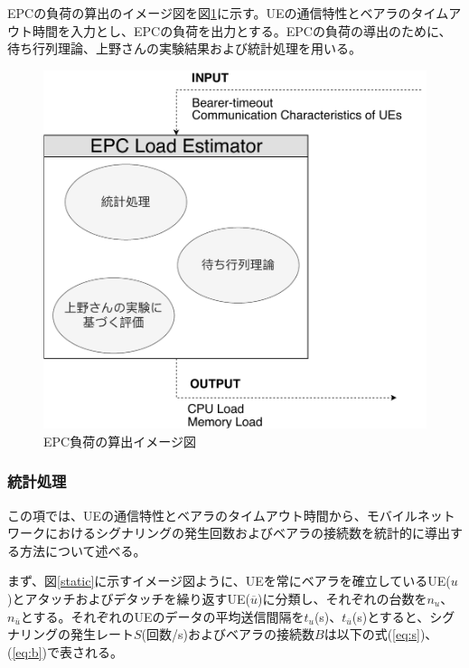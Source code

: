 \documentclass[a4j]{ujarticle}
\begin{document}
EPCの負荷の算出のイメージ図を図\ref{epc_load_estimator}に示す。UEの通信特性とベアラのタイムアウト時間を入力とし、EPCの負荷を出力とする。EPCの負荷の導出のために、待ち行列理論、上野さんの実験結果および統計処理を用いる。
\begin{figure}[htbp]
	\centering
	\includegraphics[width=0.7\hsize]{epc_load_estimator.pdf}
  \caption{EPC負荷の算出イメージ図}
	\label{epc_load_estimator}
\end{figure}
\subsubsection{統計処理}
この項では、UEの通信特性とベアラのタイムアウト時間から、モバイルネットワークにおけるシグナリングの発生回数およびベアラの接続数を統計的に導出する方法について述べる。

まず、図\ref{static}に示すイメージ図ように、UEを常にベアラを確立しているUE($u$)とアタッチおよびデタッチを繰り返すUE($\overline{u}$)に分類し、それぞれの台数を$n_u$、$n_{\overline{u}}$とする。それぞれのUEのデータの平均送信間隔を$t_u$(s)、$t_{\overline{u}}$(s)とすると、シグナリングの発生レート$S$(回数/s)およびベアラの接続数$B$は以下の式(\ref{eq:s})、(\ref{eq:b})で表される。
\end{document}
